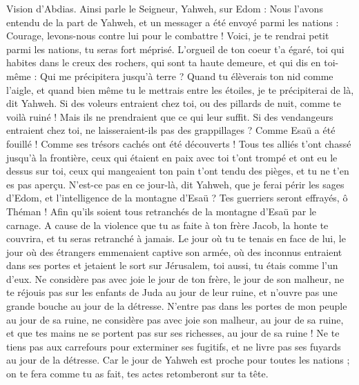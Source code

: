 \BFont
\begin{multicols}{2}
\VerseOne{}Vision d'Abdias. Ainsi parle le Seigneur, Yahweh, sur Edom : Nous l’avons entendu de la part de Yahweh, et un messager a été envoyé parmi les nations : Courage, levons-nous contre lui pour le combattre !
Voici, je te rendrai petit parmi les nations, tu seras fort méprisé.
L'orgueil de ton coeur t'a égaré, toi qui habites dans le creux des rochers, qui sont ta haute demeure, et qui dis en toi-même : Qui me précipitera jusqu’à terre ?
Quand tu élèverais ton nid comme l'aigle, et quand bien même tu le mettrais entre les étoiles, je te précipiterai de là, dit Yahweh.
Si des voleurs entraient chez toi, ou des pillards de nuit, comme te voilà ruiné ! Mais ils ne prendraient que ce qui leur suffit. Si des vendangeurs entraient chez toi, ne laisseraient-ils pas des grappillages ?
Comme Esaü a été fouillé ! Comme ses trésors cachés ont été découverts !
Tous tes alliés t'ont chassé jusqu'à la frontière, ceux qui étaient en paix avec toi t'ont trompé et ont eu le dessus sur toi, ceux qui mangeaient ton pain t'ont tendu des pièges, et tu ne t’en es pas aperçu.
N’est-ce pas en ce jour-là, dit Yahweh, que je ferai périr les sages d'Edom, et l’intelligence de la montagne d'Esaü ?
Tes guerriers seront effrayés, ô Théman ! Afin qu’ils soient tous retranchés de la montagne d'Esaü par le carnage.
A cause de la violence que tu as faite à ton frère Jacob, la honte te couvrira, et tu seras retranché à jamais.
Le jour où tu te tenais en face de lui, le jour où des étrangers emmenaient captive son armée, où des inconnus entraient dans ses portes et jetaient le sort sur Jérusalem, toi aussi, tu étais comme l'un d'eux.
Ne considère pas avec joie le jour de ton frère, le jour de son malheur, ne te réjouis pas sur les enfants de Juda au jour de leur ruine, et n’ouvre pas une grande bouche au jour de la détresse.
N’entre pas dans les portes de mon peuple au jour de sa ruine, ne considère pas avec joie son malheur, au jour de sa ruine, et que tes mains ne se portent pas sur ses richesses, au jour de sa ruine !
Ne te tiens pas aux carrefours pour exterminer ses fugitifs, et ne livre pas ses fuyards au jour de la détresse.
Car le jour de Yahweh est proche pour toutes les nations ; on te fera comme tu as fait, tes actes retomberont sur ta tête.

\end{multicols}
